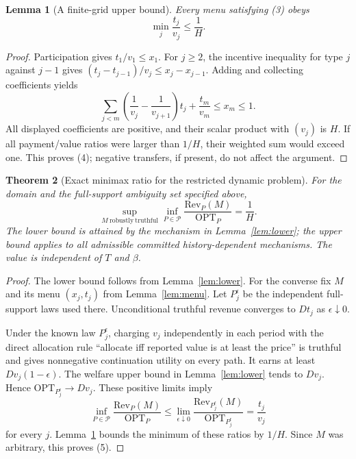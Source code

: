 \documentclass[11pt]{article}
\newtheorem{theorem}{Theorem}
\newtheorem{lemma}[theorem]{Lemma}
\theoremstyle{remark}\newtheorem{remark}[theorem]{Remark}
\begin{document}
\begin{lemma}[A finite-grid upper bound]\label{lem:telescoping}
Every menu satisfying (3) obeys
\[
 \min_j\frac{t_j}{v_j}\leq\frac1H.                             \tag{4}
\]
\end{lemma}
\begin{proof}
Participation gives $t_1/v_1\leq x_1$. For $j\geq2$, the incentive inequality for type $j$ against $j-1$ gives
$(t_j-t_{j-1})/v_j\leq x_j-x_{j-1}$. Adding and collecting coefficients yields
\[
 \sum_{j<m}\left(\frac1{v_j}-\frac1{v_{j+1}}\right)t_j
       +\frac{t_m}{v_m}\leq x_m\leq1.
\]
All displayed coefficients are positive, and their scalar product with $(v_j)$ is $H$. If all payment/value ratios were larger than $1/H$, their weighted sum would exceed one. This proves (4); negative transfers, if present, do not affect the argument.
\end{proof}

\begin{theorem}[Exact minimax ratio for the restricted dynamic problem]\label{thm:main}
For the domain and the full-support ambiguity set specified above,
\[
 \sup_{M\ \mathrm{robustly\ truthful}}
       \inf_{P\in\mathcal P}\frac{\mathrm{Rev}_P(M)}{\mathrm{OPT}_P}
       =\frac1H.                                               \tag{5}
\]
The lower bound is attained by the mechanism in Lemma~\ref{lem:lower}; the upper bound applies to all admissible committed history-dependent mechanisms. The value is independent of $T$ and $\beta$.
\end{theorem}
\begin{proof}
The lower bound follows from Lemma~\ref{lem:lower}. For the converse fix $M$ and its menu $(x_j,t_j)$ from Lemma~\ref{lem:menu}. Let $P_j^\epsilon$ be the independent full-support laws used there. Unconditional truthful revenue converges to $Dt_j$ as $\epsilon\downarrow0$.

Under the known law $P_j^\epsilon$, charging $v_j$ independently in each period with the direct allocation rule ``allocate iff reported value is at least the price'' is truthful and gives nonnegative continuation utility on every path. It earns at least $Dv_j(1-\epsilon)$. The welfare upper bound in Lemma~\ref{lem:lower} tends to $Dv_j$. Hence $\mathrm{OPT}_{P_j^\epsilon}\to Dv_j$. These positive limits imply
\[
 \inf_{P\in\mathcal P}\frac{\mathrm{Rev}_P(M)}{\mathrm{OPT}_P}
 \leq\lim_{\epsilon\downarrow0}
       \frac{\mathrm{Rev}_{P_j^\epsilon}(M)}{\mathrm{OPT}_{P_j^\epsilon}}
 =\frac{t_j}{v_j}
\]
for every $j$. Lemma~\ref{lem:telescoping} bounds the minimum of these ratios by $1/H$. Since $M$ was arbitrary, this proves (5).
\end{proof}
\end{document}
